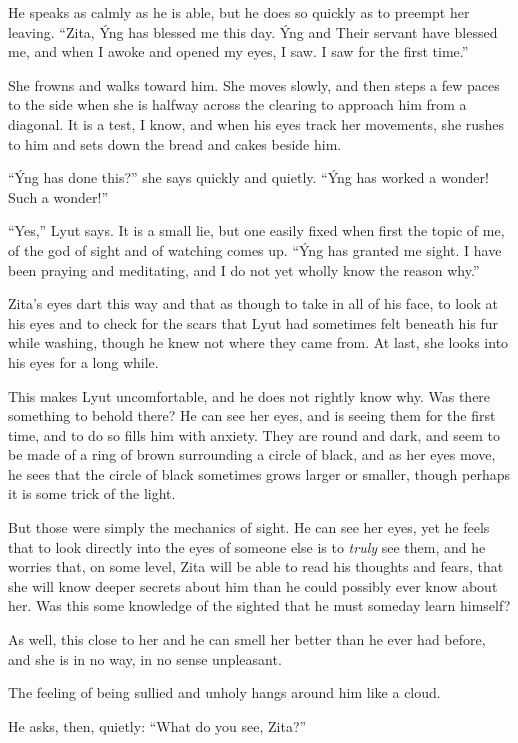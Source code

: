 He speaks as calmly as he is able, but he does so quickly as to preempt her leaving. ``Zita, Ýng has blessed me this day. Ýng and Their servant have blessed me, and when I awoke and opened my eyes, I saw. I saw for the first time.''

She frowns and walks toward him. She moves slowly, and then steps a few paces to the side when she is halfway across the clearing to approach him from a diagonal. It is a test, I know, and when his eyes track her movements, she rushes to him and sets down the bread and cakes beside him.

``Ýng has done this?'' she says quickly and quietly. ``Ýng has worked a wonder! Such a wonder!''

``Yes,'' Lyut says. It is a small lie, but one easily fixed when first the topic of me, of the god of sight and of watching comes up. ``Ýng has granted me sight. I have been praying and meditating, and I do not yet wholly know the reason why.''

Zita's eyes dart this way and that as though to take in all of his face, to look at his eyes and to check for the scars that Lyut had sometimes felt beneath his fur while washing, though he knew not where they came from. At last, she looks into his eyes for a long while.

This makes Lyut uncomfortable, and he does not rightly know why. Was there something to behold there? He can see her eyes, and is seeing them for the first time, and to do so fills him with anxiety. They are round and dark, and seem to be made of a ring of brown surrounding a circle of black, and as her eyes move, he sees that the circle of black sometimes grows larger or smaller, though perhaps it is some trick of the light.

But those were simply the mechanics of sight. He can see her eyes, yet he feels that to look directly into the eyes of someone else is to \emph{truly} see them, and he worries that, on some level, Zita will be able to read his thoughts and fears, that she will know deeper secrets about him than he could possibly ever know about her. Was this some knowledge of the sighted that he must someday learn himself?

As well, this close to her and he can smell her better than he ever had before, and she is in no way, in no sense unpleasant.

The feeling of being sullied and unholy hangs around him like a cloud.

He asks, then, quietly: ``What do you see, Zita?''

